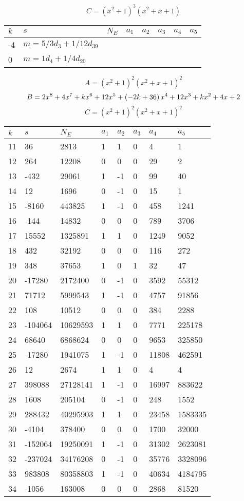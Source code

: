\documentclass{amsart}
\begin{document}
$$C=(x^2
 + 1)^{3}(x^2
 + x
 + 1)$$
\begin{longtable}{|l|l|l|lllll|}
\hline
$k$ & $s$ & $N_E$ & $a_1$ & $a_2$ & $a_3$ & $a_4$ & $a_5$\\
\hline
-4&$m=5/3d_{3}+1/12d_{39}$&&\multicolumn{5}{c|}{}\\
0&$m=1d_{4}+1/4d_{20}$&&\multicolumn{5}{c|}{}\\
\hline
\end{longtable}
$$A=(x^2
 + 1)^{2}(x^2
 + x
 + 1)^{2}$$
$$B=2\*x^8
 + 4\*x^7
 + k\*x^6
 + 12\*x^5
 + \left(-2\*k
 + 36\right) \*x^4
 + 12\*x^3
 + k\*x^2
 + 4\*x
 + 2$$
$$C=(x^2
 + 1)^{2}(x^2
 + x
 + 1)^{2}$$
\begin{longtable}{|l|l|l|lllll|}
\hline
$k$ & $s$ & $N_E$ & $a_1$ & $a_2$ & $a_3$ & $a_4$ & $a_5$\\
\hline
11&36&2813&1&1&0&4&1\\
12&264&12208&0&0&0&29&2\\
13&-432&29061&1&-1&0&99&40\\
14&12&1696&0&-1&0&15&1\\
15&-8160&443825&1&-1&0&458&1241\\
16&-144&14832&0&0&0&789&3706\\
17&15552&1325891&1&1&0&1249&9052\\
18&432&32192&0&0&0&116&272\\
19&348&37653&1&0&1&32&47\\
20&-17280&2172400&0&-1&0&3592&55312\\
21&71712&5999543&1&-1&0&4757&91856\\
22&108&10512&0&0&0&384&2288\\
23&-104064&10629593&1&1&0&7771&225178\\
24&68640&6868624&0&0&0&9653&325850\\
25&-17280&1941075&1&-1&0&11808&462591\\
26&12&2674&1&1&0&4&4\\
27&398088&27128141&1&-1&0&16997&883622\\
28&1608&205104&0&-1&0&248&1552\\
29&288432&40295903&1&1&0&23458&1583335\\
30&-4104&378400&0&0&0&1700&32000\\
31&-152064&19250091&1&-1&0&31302&2623081\\
32&-237024&34176208&0&-1&0&35776&3328096\\
33&983808&80358803&1&-1&0&40634&4184795\\
34&-1056&163008&0&0&0&2868&81520\\

\end{longtable}
\end{document}
